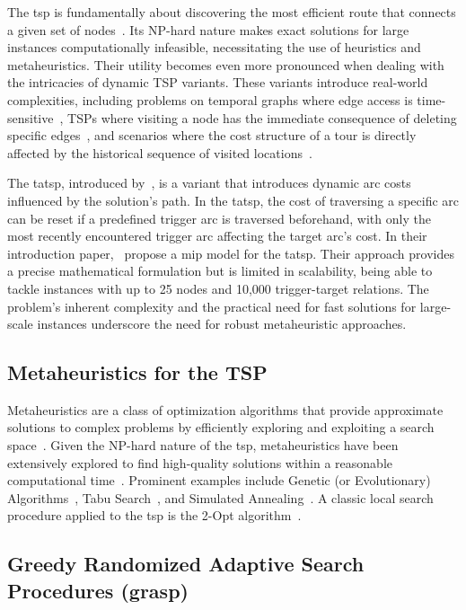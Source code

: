 \documentclass[twocolumn, switch]{article} %
\begin{document}
The \gls{tsp} is fundamentally about discovering the most efficient route that connects a given set of nodes~\cite{Applegate2011}. 
Its NP-hard nature makes exact solutions for large instances computationally infeasible, necessitating the use of heuristics and metaheuristics.
Their utility becomes even more pronounced when dealing with the intricacies of dynamic TSP variants.
These variants introduce real-world complexities, including problems on temporal graphs where edge access is time-sensitive~\cite{timedependenttsp}, 
TSPs where visiting a node has the immediate consequence of deleting specific edges~\cite{traversaldependenttsp}, and scenarios where the cost structure of a tour is directly affected by the historical sequence of visited locations~\cite{Bossek2020}.

The \gls{tatsp}, introduced by~\citet{Cerrone}, is a variant that introduces dynamic arc costs influenced by the solution's path. 
In the \gls{tatsp}, the cost of traversing a specific arc can be reset if a predefined trigger arc is traversed beforehand, 
with only the most recently encountered trigger arc affecting the target arc's cost. In their introduction paper,~\citet{Cerrone} 
propose a \gls{mip} model for the \gls{tatsp}. Their approach provides a precise mathematical formulation 
but is limited in scalability, being able to tackle instances with up to 25 nodes and 10,000 trigger-target relations. 
The problem's inherent complexity and the practical need for fast solutions for large-scale instances underscore the need for robust metaheuristic approaches.

\subsection{Metaheuristics for the TSP}
\label{sec:metaheuristics_tsp}

Metaheuristics are a class of optimization algorithms that provide approximate solutions to complex problems by efficiently exploring and exploiting a search space~\cite{Gendreau2010}.
Given the NP-hard nature of the \gls{tsp}, metaheuristics have been extensively explored to find high-quality solutions within a reasonable computational time~\cite{toaza2023}.
Prominent examples include Genetic (or Evolutionary) Algorithms~\cite{Larranaga1999}, Tabu Search~\cite{Knox1994}, and Simulated Annealing~\cite{anttsp}.
A classic local search procedure applied to the \gls{tsp} is the 2-Opt algorithm~\cite{Croes1958}.

\subsection{Greedy Randomized Adaptive Search Procedures (\gls{grasp})}
\end{document}
